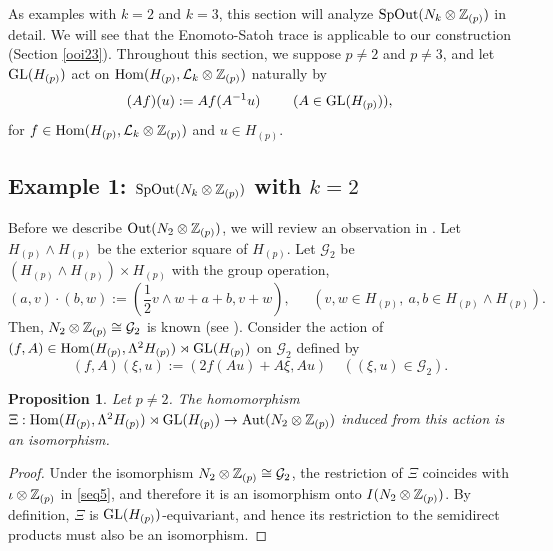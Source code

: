 \documentclass{article}
\theoremstyle{plain}
\newtheorem{prop}[thm]{Proposition}
\theoremstyle{definition}
\def\Hom{\mathop{\mathrm{Hom}}\nolimits}
\newcommand{\ra}{\rightarrow}
\newcommand{\Z}{{\Bbb Z}}
\newcommand{\Aut}{{\rm Aut}}
\newcommand{\Out}{{\rm Out}}
\newcommand{\GL}{{\rm GL}}
\begin{document}
{As examples with $k=2$ and $k=3$, this section will analyze $\mathrm{SpOut}(N_k \otimes \Z_{(p)}) $ in detail. We will see that the Enomoto-Satoh trace \cite{ES, Sa1} is applicable to our construction (Section \ref{ooi23}). Throughout this section, we suppose $p \neq 2$ and $p\neq 3$, and let $ \GL(H_{(p)} )$ act on $\Hom( H_{(p)}, \mathcal{L}_k \otimes \Z_{(p)})$ naturally by
\begin{equation}\label{seq8}
(Af)(u) := Af(A^{-1} u) \ \ \ \ \ \ \ (A \in \GL( H_{(p)})),
\end{equation}
for $f \in \Hom( H_{(p)}, \mathcal{L}_k \otimes \Z_{(p)})$ and $u \in H_{(p)}$.

\subsection{Example 1: $\mathrm{SpOut}(N_k \otimes \Z_{(p)}) $ with $k=2$}
\label{93883}
Before we describe $\Out( N_2 \otimes \Z_{(p)})$, we will review an observation in \cite[Page 204]{Mo}. Let $H_{(p)} \wedge H_{(p)} $ be the exterior square of $H_{(p)} $. Let $\mathcal{G}_2$ be $(H_{(p)} \wedge H_{(p)}) \times H_{(p)} $ with the group operation,
\[ ( a,v) \cdot ( b,w) := (\frac{1}{2}v\wedge w + a +b,v+w ), \ \ \ \ \ \ \ (v,w \in H_{(p)} , \ a,b \in H_{(p)} \wedge H_{(p)}).\]
Then, $N_2\otimes \Z_{(p)} \cong \mathcal{G}_2$ is known (see \cite{Mo}). Consider the action of $(f,A) \in \Hom( H_{(p)}, \Lambda^2 H_{(p)}) \rtimes \GL(H_{(p)} ) $ on $\mathcal{G}_2$ defined by
\[ (f,A)(\xi,u):= (2f(Au)+ A \xi , Au ) \ \ \ \ \ ((\xi,u) \in \mathcal{G}_2 ) . \]
\begin{prop}\label{312aa}
Let $p \neq 2$. 
The homomorphism $\Xi: \Hom( H_{(p)}, \Lambda^2 H_{(p)}) \rtimes \GL(H_{(p)} ) \ra \Aut(N_2 \otimes \Z_{(p)})$ induced from this action is an isomorphism.
 \end{prop}   
\begin{proof} 
Under the isomorphism $N_2\otimes \Z_{(p)} \cong \mathcal{G}_2 $,
the restriction of $\Xi$ coincides with $\iota \otimes \Z_{(p)}$ in \eqref{seq5}, and therefore it is an isomorphism onto $I(N_2 \otimes \Z_{(p)})$. By definition, $\Xi$ is $\GL(H_{(p)})$-equivariant, and hence its restriction to the semidirect products must also be an isomorphism.
 \end{proof}

}
\end{document}
